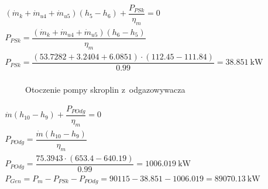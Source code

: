 \begin{math}
	\begin{array}{l}
		(\dot m_k + \dot m_{u4} + \dot m_{u5})(h_5 - h_6)
			+ \dfrac{P_{PSk}}{\eta_m} = 0 \\
		P_{PSk} = \dfrac{(\dot m_k + \dot m_{u4} + \dot m_{u5})(h_6 - h_5)
			}{\eta_m} \\
		P_{PSk} = \dfrac{(\num{53,7282} + \num{3,2404} + \num{6,0851})
				\cdot (\num{112,45} - \num{111,84})
			}{\num{0,99}}
			= \SI{38,851}{\kilo\watt} \\
	\end{array}
\end{math}

\clearpage
\begin{figure}[H]
	\centering

	\caption{Otoczenie pompy skroplin z~odgazowywacza}
\end{figure}

\begin{math}
	\begin{array}{l}
		\dot m (h_{10} - h_9) + \dfrac{P_{POdg}}{\eta_m} = 0 \\
		P_{POdg} = \dfrac{\dot m (h_{10} - h_9)}{\eta_m} \\
		P_{POdg} = \dfrac{\num{75,3943} \cdot (\num{653,4} - \num{640,19})
			}{\num{0,99}}
			= \SI{1006,019}{\kilo\watt} \\
		P_{Gen} = P_m - P_{PSk} - P_{POdg}
			= \num{90115} - \num{38,851} - \num{1006,019}
			= \SI{89070,13}{\kilo\watt} \\
	\end{array}
\end{math}

